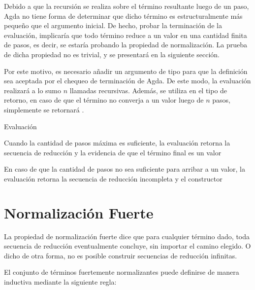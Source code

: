 Debido a que la recursión se realiza sobre el término resultante luego de un paso, Agda no tiene forma de determinar que dicho término es estructuralmente más pequeño que el argumento inicial.
De hecho, probar la terminación de la evaluación, implicaría que todo término reduce a un valor en una cantidad finita de pasos, es decir, se estaría probando la propiedad de normalización.
La prueba de dicha propiedad no es trivial, y se presentará en la siguiente sección.

Por este motivo, es necesario añadir un argumento de tipo  para que la definición sea aceptada por el chequeo de terminación de Agda.
De este modo, la evaluación realizará a lo sumo $n$ llamadas recursivas.
Además, se utiliza  en el tipo de retorno, en caso de que el término no converja a un valor luego de $n$ pasos, simplemente se retornará .


\begin{codigo}
	Evaluación
\end{codigo}

\begin{example}
	Cuando la cantidad de pasos máxima es suficiente, la evaluación retorna la secuencia de reducción y la evidencia de que el término final es un valor
\end{example}

\begin{example}
	En caso de que la cantidad de pasos no sea suficiente para arribar a un valor, la evaluación retorna la secuencia de reducción incompleta y el constructor 
\end{example}

\section{Normalización Fuerte}

La propiedad de normalización fuerte dice que para cualquier término dado, toda secuencia de reducción eventualmente concluye, sin importar el camino elegido.
O dicho de otra forma, no es posible construir secuencias de reducción infinitas.

El conjunto de términos fuertemente normalizantes puede definirse de manera inductiva mediante la siguiente regla:

\begin{center}
	\begin{prooftree}
	\end{prooftree}
\end{center}

